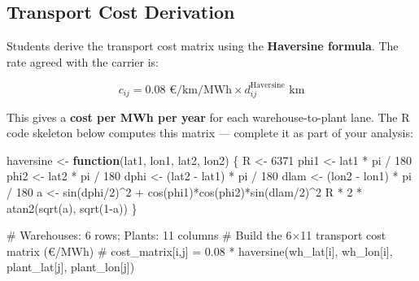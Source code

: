 \documentclass[
  a4paper,
]{article}
\newenvironment{Shaded}{\begin{snugshade}}{\end{snugshade}}
\newcommand{\CommentTok}[1]{\textcolor[rgb]{0.37,0.37,0.37}{#1}}
\newcommand{\ControlFlowTok}[1]{\textcolor[rgb]{0.00,0.23,0.31}{\textbf{#1}}}
\newcommand{\DecValTok}[1]{\textcolor[rgb]{0.68,0.00,0.00}{#1}}
\newcommand{\FunctionTok}[1]{\textcolor[rgb]{0.28,0.35,0.67}{#1}}
\newcommand{\NormalTok}[1]{\textcolor[rgb]{0.00,0.23,0.31}{#1}}
\newcommand{\OtherTok}[1]{\textcolor[rgb]{0.00,0.23,0.31}{#1}}
\newcommand{\SpecialCharTok}[1]{\textcolor[rgb]{0.37,0.37,0.37}{#1}}
\begin{document}
\subsection{Transport Cost Derivation}\label{transport-cost-derivation}

Students derive the transport cost matrix using the \textbf{Haversine
formula}. The rate agreed with the carrier is:

\[c_{ij} = 0.08 \text{ €/km/MWh} \times d_{ij}^{\text{Haversine}} \text{ km}\]

This gives a \textbf{cost per MWh per year} for each warehouse-to-plant
lane. The R code skeleton below computes this matrix --- complete it as
part of your analysis:

\begin{Shaded}
\begin{Highlighting}[]
\NormalTok{haversine }\OtherTok{\textless{}{-}} \ControlFlowTok{function}\NormalTok{(lat1, lon1, lat2, lon2) \{}
\NormalTok{  R    }\OtherTok{\textless{}{-}} \DecValTok{6371}
\NormalTok{  phi1 }\OtherTok{\textless{}{-}}\NormalTok{ lat1 }\SpecialCharTok{*}\NormalTok{ pi }\SpecialCharTok{/} \DecValTok{180}
\NormalTok{  phi2 }\OtherTok{\textless{}{-}}\NormalTok{ lat2 }\SpecialCharTok{*}\NormalTok{ pi }\SpecialCharTok{/} \DecValTok{180}
\NormalTok{  dphi }\OtherTok{\textless{}{-}}\NormalTok{ (lat2 }\SpecialCharTok{{-}}\NormalTok{ lat1) }\SpecialCharTok{*}\NormalTok{ pi }\SpecialCharTok{/} \DecValTok{180}
\NormalTok{  dlam }\OtherTok{\textless{}{-}}\NormalTok{ (lon2 }\SpecialCharTok{{-}}\NormalTok{ lon1) }\SpecialCharTok{*}\NormalTok{ pi }\SpecialCharTok{/} \DecValTok{180}
\NormalTok{  a    }\OtherTok{\textless{}{-}} \FunctionTok{sin}\NormalTok{(dphi}\SpecialCharTok{/}\DecValTok{2}\NormalTok{)}\SpecialCharTok{\^{}}\DecValTok{2} \SpecialCharTok{+} \FunctionTok{cos}\NormalTok{(phi1)}\SpecialCharTok{*}\FunctionTok{cos}\NormalTok{(phi2)}\SpecialCharTok{*}\FunctionTok{sin}\NormalTok{(dlam}\SpecialCharTok{/}\DecValTok{2}\NormalTok{)}\SpecialCharTok{\^{}}\DecValTok{2}
\NormalTok{  R }\SpecialCharTok{*} \DecValTok{2} \SpecialCharTok{*} \FunctionTok{atan2}\NormalTok{(}\FunctionTok{sqrt}\NormalTok{(a), }\FunctionTok{sqrt}\NormalTok{(}\DecValTok{1}\SpecialCharTok{{-}}\NormalTok{a))}
\NormalTok{\}}

\CommentTok{\# Warehouses: 6 rows; Plants: 11 columns}
\CommentTok{\# Build the 6×11 transport cost matrix (€/MWh)}
\CommentTok{\# cost\_matrix[i,j] = 0.08 * haversine(wh\_lat[i], wh\_lon[i], plant\_lat[j], plant\_lon[j])}
\end{Highlighting}
\end{Shaded}
\end{document}
